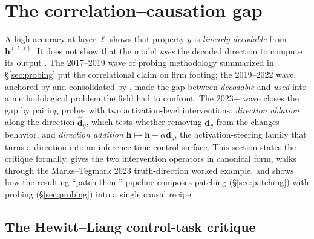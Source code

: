 
\section{The correlation--causation gap}
\label{sec:correlation-causation}

A high-accuracy  at layer $\ell$ shows that property $y$ is
\emph{linearly decodable} from $\mathbf{h}^{(\ell, t)}$. It does not
show that the model \emph{uses} the decoded direction to compute its
output \citep{belinkov2022-probing-survey}. The 2017--2019 wave of
probing methodology summarized in \S\ref{sec:probing} put the
correlational claim on firm footing; the 2019--2022 wave, anchored by
\citet{hewitt2019-control-tasks} and consolidated by
\citet{belinkov2022-probing-survey}, made the gap between
\emph{decodable} and \emph{used} into a methodological problem the
field had to confront. The 2023+ wave closes the gap by pairing
probes with two activation-level interventions: \emph{direction
ablation} along the  direction $\hat{\mathbf{d}}_y$, which tests
whether removing $\mathbf{d}_y$ from the  changes
behavior, and \emph{direction addition} $\mathbf{h} \mapsto \mathbf{h} +
\alpha \hat{\mathbf{d}}_y$, the activation-steering family that turns
a  direction into an inference-time control surface. This section
states the critique formally, gives the two intervention operators in
canonical form, walks through the Marks--Tegmark 2023 truth-direction
worked example, and shows how the resulting ``patch-then-''
pipeline composes patching (\S\ref{sec:patching}) with probing
(\S\ref{sec:probing}) into a single causal recipe.

\subsection{The Hewitt--Liang control-task critique}
\label{sec:control-tasks}

